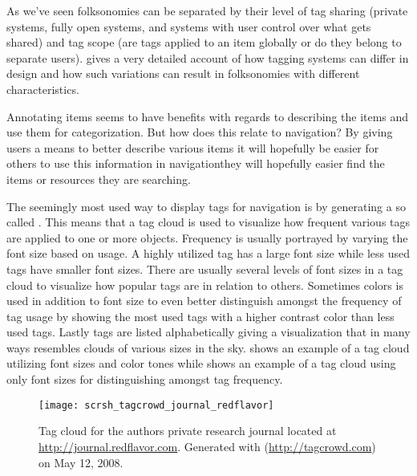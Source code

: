 As we've seen folksonomies can be separated by their level of tag sharing
(private systems, fully open systems, and systems with user control over
what gets shared) and tag scope (are tags applied to an item globally
or do they belong to separate users).
\citet[]{marlow06} gives a very detailed account of how tagging
systems can differ in design and how such variations can result in
folksonomies with different characteristics.

Annotating items seems to have benefits with regards to describing the items
and use them for categorization. But how does this relate to navigation?
By giving users a means to better describe various items it will hopefully be
easier for others to use this information in navigation\dash{}they will
hopefully easier find the items or resources they are searching.

The seemingly most used way to display tags for navigation is by generating
a so called %
.
This means that a tag cloud is used to visualize how frequent various tags
are applied to one or more objects. Frequency is usually portrayed by varying
the font size based on usage. A highly utilized tag has a large font size
while less used tags have smaller font sizes. There are usually several levels
of font sizes in a tag cloud to visualize how popular tags are in relation to
others. Sometimes colors is used in addition to font size to even better
distinguish amongst the frequency of tag usage by showing the most used tags
with a higher contrast color than less used tags. Lastly tags are listed
alphabetically giving a visualization that in many ways resembles clouds of
various sizes in the sky.
shows an example of a tag cloud utilizing font sizes and color tones while
 shows an example of a tag cloud using
only font sizes for distinguishing amongst tag frequency.

\begin{figure}
  \centering
  \texttt{[image: scrsh\_tagcrowd\_journal\_redflavor]}
  \caption[Research Journal Tag Cloud]{
    Tag cloud for the authors private research journal located
    at \url{http://journal.redflavor.com}. Generated with
     (\url{http://tagcrowd.com}) on May 12, 2008.
  }
  \label{figure:scrsh.tagcrowd.journal.redflavor}
\end{figure}


